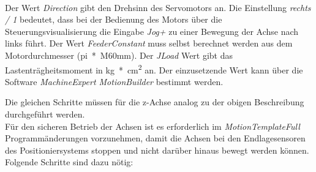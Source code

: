 \documentclass[../../../Bachelorarbeit.tex]{subfiles}
\begin{document}
\begin{enumerate}
\begin{minipage}[t]{\linewidth}
        \raggedright
        \label{fig:my-img36}
    \end{minipage}
    \bigskip \\
    Der Wert \textit{Direction} gibt den Drehsinn des Servomotors an. Die Einstellung \textit{rechts / 1} bedeutet, dass bei der Bedienung des Motors über die Steuerungsvisualisierung die Eingabe \textit{Jog+} zu einer Bewegung der Achse nach links führt. Der Wert \textit{FeederConstant} muss selbst berechnet werden aus dem Motordurchmesser (\si{pi*M60mm}). Der \textit{JLoad} Wert gibt das Lastenträgheitsmoment in \si{kg*cm^2} an. Der einzusetzende Wert kann über die Software \textit{MachineExpert MotionBuilder} bestimmt werden. 
\end{enumerate}

Die gleichen Schritte müssen für die z-Achse analog zu der obigen Beschreibung durchgeführt werden.\\
\bigskip
Für den sicheren Betrieb der Achsen ist es erforderlich im \textit{MotionTemplateFull} Programmänderungen vorzunehmen, damit die Achsen bei den Endlagesensoren des Positioniersystems stoppen und nicht darüber hinaus bewegt werden können. Folgende Schritte sind dazu nötig:
\end{document}
